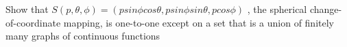 Show that \(S(p, \theta, \phi) = (p sin \phi cos \theta, p sin \phi sin \theta, p cos \phi)\) , the spherical change-of-coordinate mapping, is one-to-one except on a set that is a union of finitely many graphs of continuous functions
